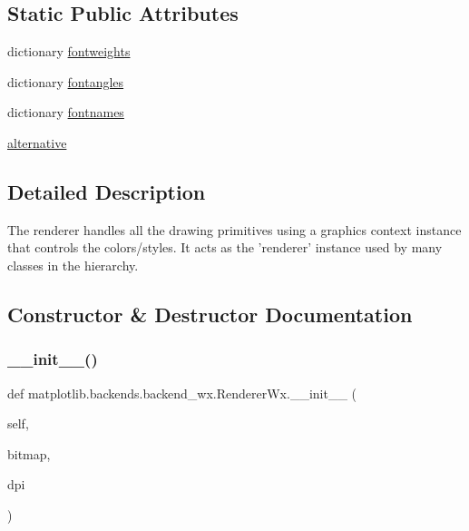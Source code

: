 \subsection*{Static Public Attributes}
\begin{DoxyCompactItemize}
\item 
dictionary \hyperlink{classmatplotlib_1_1backends_1_1backend__wx_1_1RendererWx_a54579a87317e77a89511cad65d0807df}{fontweights}
\item 
dictionary \hyperlink{classmatplotlib_1_1backends_1_1backend__wx_1_1RendererWx_a953cb7d7cc2651c89383681dc5ed568c}{fontangles}
\item 
dictionary \hyperlink{classmatplotlib_1_1backends_1_1backend__wx_1_1RendererWx_a644c66241b82952a435b80037c2b4aad}{fontnames}
\item 
\hyperlink{classmatplotlib_1_1backends_1_1backend__wx_1_1RendererWx_a4a83c21bafc657131ccf3936357b5995}{alternative}
\end{DoxyCompactItemize}


\subsection{Detailed Description}
\begin{DoxyVerb}The renderer handles all the drawing primitives using a graphics
context instance that controls the colors/styles. It acts as the
'renderer' instance used by many classes in the hierarchy.
\end{DoxyVerb}
 

\subsection{Constructor \& Destructor Documentation}
\mbox{\label{classmatplotlib_1_1backends_1_1backend__wx_1_1RendererWx_a2c5b2042fc22d02b25f68faa302b50a7}} 
\subsubsection{\texorpdfstring{\+\_\+\+\_\+init\+\_\+\+\_\+()}{\_\_init\_\_()}}
{\footnotesize\ttfamily def matplotlib.\+backends.\+backend\+\_\+wx.\+Renderer\+Wx.\+\_\+\+\_\+init\+\_\+\+\_\+ (\begin{DoxyParamCaption}\item[{}]{self,  }\item[{}]{bitmap,  }\item[{}]{dpi }\end{DoxyParamCaption})}

